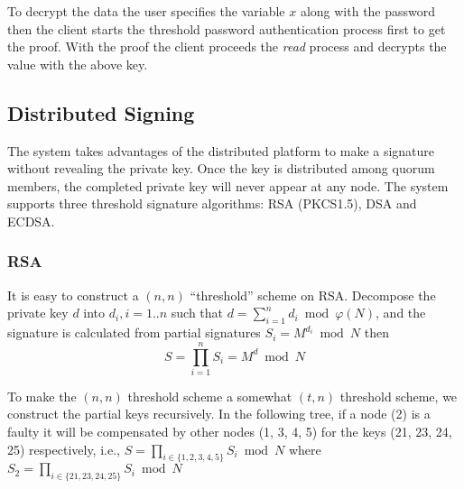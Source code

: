 \documentclass[twoside,twocolumn,10pt,fleqn]{article}
\begin{document}
To decrypt the data the user specifies the variable $x$ along with the
password then the client starts the threshold password authentication
process first to get the proof. With the proof the client proceeds the
{\em read} process and decrypts the value with the above key.

\subsection{Distributed Signing}
The system takes advantages of the distributed platform to make a
signature without revealing the private key. Once the key is
distributed among quorum members, the completed private key will never
appear at any node. The system supports three threshold signature
algorithms: RSA (PKCS1.5), DSA and ECDSA.

\subsubsection*{RSA}
It is easy to construct a $(n, n)$ ``threshold'' scheme on
RSA. Decompose the private key $d$ into $d_i, i = 1..n$ such that
$d = \sum_{i=1}^{n} d_i \bmod \varphi(N)$, and the signature is
calculated from partial signatures $S_i = M^{d_i} \bmod N$ then
\[
  S = \prod_{i=1}^{n} S_i = M^d \bmod N
\]

To make the $(n, n)$ threshold scheme a somewhat $(t, n)$ threshold
scheme, we construct the partial keys recursively. In the following
tree, if a node (2) is a faulty it will be compensated by other nodes
(1, 3, 4, 5) for the keys (21, 23, 24, 25) respectively, i.e., $S =
\prod_{i \in \{1,2,3,4,5\}} S_i \bmod N$ where $S_2 = \prod_{i \in
  \{21,23,24,25\}} S_i \bmod N$

\end{document}
